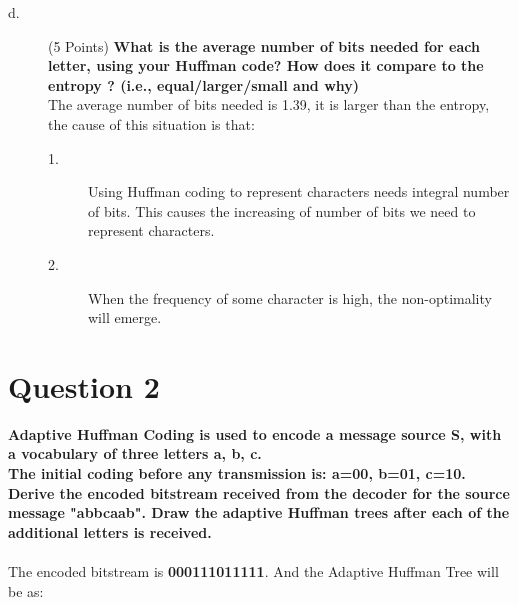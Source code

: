 \documentclass[a4paper]{article}
\begin{document}
\begin{spacing}{1.5}
\begin{description}
      \item[d.] (5 Points) \textbf{What is the average number of bits needed for each letter, using your Huffman code? How does it compare to the entropy ? (i.e., equal/larger/small and why)}\\
      \noindent{} The average number of bits needed is 1.39, it is larger than the entropy, the cause of this situation is that: 
      \begin{description}
        \item[1.] Using Huffman coding to represent characters needs integral number of bits. This causes the increasing of number of bits we need to represent characters.
        \item[2.] When the frequency of some character is high, the non-optimality will emerge.
      \end{description}
    \end{description}
  \end{spacing}
  
\section* {Question 2}
  \begin{spacing}{1.5}
    \noindent{}\textbf{Adaptive Huffman Coding is used to encode a message source S, with a vocabulary of three letters a, b, c.}\\
    \textbf{The initial coding before any transmission is: a=00, b=01, c=10.}\\
    \textbf{Derive the encoded bitstream received from the decoder for the source message "abbcaab". Draw the adaptive Huffman trees after each of the additional letters is received.}\\\\
    \noindent{} The encoded bitstream is \textbf{000111011111}. And the Adaptive Huffman Tree will be as:
    \begin{center}
      
    \end{center}
  \end{spacing}
\end{document}
